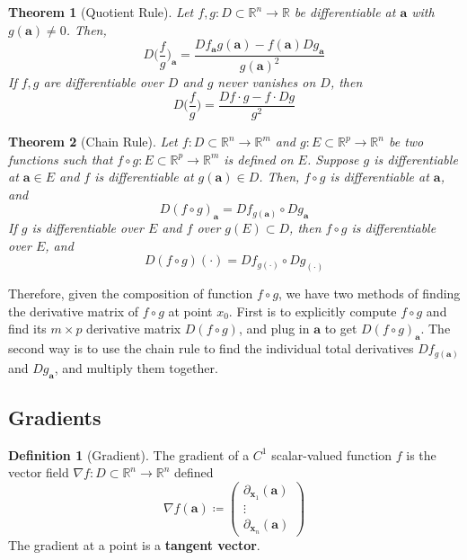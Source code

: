 \documentclass{article}
\newtheorem{theorem}{Theorem}[section]
\theoremstyle{remark}
\theoremstyle{definition}
\newtheorem{definition}{Definition}[section]
\begin{document}
\begin{theorem}[Quotient Rule]
Let $f, g: D \subset \mathbb{R}^n \longrightarrow \mathbb{R}$ be differentiable at $\mathbf{a}$ with $g(\mathbf{a}) \neq 0$. Then, 
\[D \Big( \frac{f}{g} \Big)_\mathbf{a} = \frac{D f_\mathbf{a} g(\mathbf{a}) - f(\mathbf{a}) D g_\mathbf{a}}{g(\mathbf{a})^2}\]
If $f, g$ are differentiable over $D$ and $g$ never vanishes on $D$, then 
\[D \Big( \frac{f}{g} \Big) = \frac{D f \cdot g - f \cdot D g}{g^2}\]
\end{theorem}

\begin{theorem}[Chain Rule]
Let $f: D \subset \mathbb{R}^n \longrightarrow \mathbb{R}^m$ and $g: E \subset \mathbb{R}^p \longrightarrow \mathbb{R}^n$ be two functions such that $f \circ g: E \subset \mathbb{R}^p \longrightarrow \mathbb{R}^m$ is defined on $E$. Suppose $g$ is differentiable at $\mathbf{a} \in E$ and $f$ is differentiable at $g(\mathbf{a}) \in D$. Then, $f \circ g$ is differentiable at $\mathbf{a}$, and 
\[D (f \circ g)_\mathbf{a} = D f_{g(\mathbf{a})} \circ D g_\mathbf{a}\]
If $g$ is differentiable over $E$ and $f$ over $g(E) \subset D$, then $f \circ g$ is differentiable over $E$, and 
\[D (f \circ g)(\cdot)  = D f_{g(\cdot)} \circ D g_{(\cdot)}\]
\end{theorem}

Therefore, given the composition of function $f \circ g$, we have two methods of finding the derivative matrix of $f \circ g$ at point $x_0$. First is to explicitly compute $f \circ g$ and find its $m \times p$ derivative matrix $D (f \circ g)$, and plug in $\mathbf{a}$ to get $D(f\circ g)_\mathbf{a}$. The second way is to use the chain rule to find the individual total derivatives $D f_{g(\mathbf{a})}$ and $D g_\mathbf{a}$, and multiply them together. 

\subsection{Gradients}

\begin{definition}[Gradient]
The gradient of a $C^1$ scalar-valued function $f$ is the vector field $\nabla f: D \subset \mathbb{R}^n \longrightarrow \mathbb{R}^n$ defined 
\[\nabla f(\mathbf{a}) \coloneqq \begin{pmatrix} \partial_{\mathbf{x}_1} (\mathbf{a}) \\ \vdots \\ \partial_{\mathbf{x}_n} (\mathbf{a}) \end{pmatrix} \]
The gradient at a point is a \textbf{tangent vector}. 
\end{definition}
\end{document}
